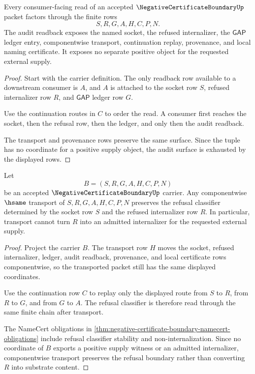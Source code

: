 \begin{theorem}
\label{thm:negative-certificate-boundary-audit-surface}
Every consumer-facing read of an accepted $\NegativeCertificateBoundaryUp$ packet factors through the finite rows
$$
S,R,G,A,H,C,P,N.
$$
The audit readback exposes the named socket, the refused internalizer, the $\mathsf{GAP}$ ledger entry, componentwise transport, continuation replay, provenance, and local naming certificate. It exposes no separate positive object for the requested external supply.
\end{theorem}
\begin{proof}
Start with the carrier definition. The only readback row available to a downstream consumer is $A$, and $A$ is attached to the socket row $S$, refused internalizer row $R$, and $\mathsf{GAP}$ ledger row $G$.

Use the continuation routes in $C$ to order the read. A consumer first reaches the socket, then the refusal row, then the ledger, and only then the audit readback.

The transport and provenance rows preserve the same surface. Since the tuple has no coordinate for a positive supply object, the audit surface is exhausted by the displayed rows.
\end{proof}

\begin{theorem}
\label{thm:negative-certificate-boundary-refusal-classifier-stability}
Let
$$
B=(S,R,G,A,H,C,P,N)
$$
be an accepted $\NegativeCertificateBoundaryUp$ carrier. Any componentwise $\hsame$ transport of $S,R,G,A,H,C,P,N$ preserves the refusal classifier determined by the socket row $S$ and the refused internalizer row $R$. In particular, transport cannot turn $R$ into an admitted internalizer for the requested external supply.
\end{theorem}
\begin{proof}
Project the carrier $B$. The transport row $H$ moves the socket, refused internalizer, ledger, audit readback, provenance, and local certificate rows componentwise, so the transported packet still has the same displayed coordinates.

Use the continuation row $C$ to replay only the displayed route from $S$ to $R$, from $R$ to $G$, and from $G$ to $A$. The refusal classifier is therefore read through the same finite chain after transport.

The NameCert obligations in \autoref{thm:negative-certificate-boundary-namecert-obligations} include refusal classifier stability and non-internalization. Since no coordinate of $B$ exports a positive supply witness or an admitted internalizer, componentwise transport preserves the refusal boundary rather than converting $R$ into substrate content.
\end{proof}

